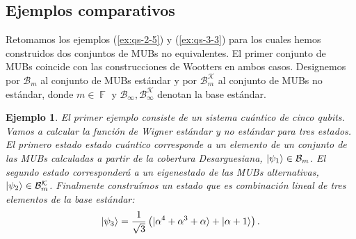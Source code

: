 \documentclass[a4paper]{report}
\DeclareMathOperator{\F}{\mathbb{F}}
\newtheorem{example}{Ejemplo}
\begin{document}
  \subsection{Ejemplos comparativos} 

  Retomamos los ejemplos (\ref{ex:qs-2-5}) y
  (\ref{ex:qs-3-3}) para los cuales hemos construidos dos
  conjuntos de MUBs no equivalentes. El primer conjunto de
  MUBs coincide con las construcciones de Wootters en ambos
  casos. Designemos por $\mathcal B_m$ al conjunto de MUBs
  estándar y por $\mathcal B_m^{\mathcal K}$ al conjunto de
  MUBs no estándar, donde $m \in \F$ y $\mathcal B_\infty,
  \mathcal B_\infty^{\mathcal K}$ denotan la base estándar.

  \begin{example}
    El primer ejemplo consiste de un sistema cuántico de
    cinco qubits. Vamos a calcular la función de Wigner
    estándar y no estándar para tres estados. El primero
    estado estado cuántico corresponde a un elemento de un
    conjunto de las MUBs calculadas a partir de la cobertura
    Desarguesiana, $\ket{\psi_1} \in \mathcal B_m$. El
    segundo estado corresponderá a un eigenestado de las
    MUBs alternativas, $\ket{\psi_2} \in \mathcal
    B_m^{\mathcal K}$. Finalmente construímos un estado que
    es combinación lineal de tres elementos de la base
    estándar:
    \[
      \ket{\psi_3}
      = \frac{1}{\sqrt{3}} \left(
        \ket{\alpha^{4} + \alpha^3 + \alpha}
        + 
        \ket{\alpha+1}
      \right).
    \] 
  \end{example}
\end{document}
